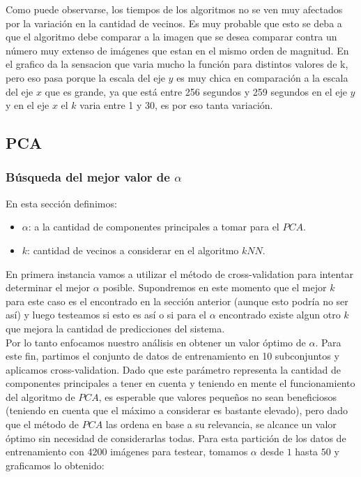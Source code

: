 Como puede observarse, los tiempos de los algoritmos no se ven muy afectados por la variación en la cantidad de vecinos. Es muy probable que esto se deba a que el algoritmo debe comparar a la imagen que se desea comparar contra un número muy extenso de imágenes que estan en el mismo orden de magnitud.
En el grafico da la sensacion que varia mucho la función para distintos valores de k, pero eso pasa porque la escala del eje $y$ es muy chica en comparación a la escala del eje $x$ que es grande, ya que está entre 256 segundos y 259 segundos en el eje $y$ y en el eje $x$  el $k$ varia entre 1 y 30, es por eso tanta variación.

\subsection{PCA}
\subsubsection{Búsqueda del mejor valor de $\alpha$}
En esta sección definimos:
\begin{itemize}
	\item $\alpha$: a la cantidad de componentes principales a tomar para el $PCA$.
	\item $k$: cantidad de vecinos a considerar en el algoritmo $kNN$.
\end{itemize}
En primera instancia vamos a utilizar el método de cross-validation para intentar determinar el mejor $\alpha$ posible. Supondremos en este momento que el mejor $k$ para este caso es el encontrado en la sección anterior (aunque esto podría no ser así) y luego testeamos si esto es así o si para el $\alpha$ encontrado existe algun otro $k$ que mejora la cantidad de predicciones del sistema.
\\
Por lo tanto enfocamos nuestro análisis en obtener un valor óptimo de $\alpha$. Para este fin, partimos el conjunto de datos de entrenamiento en 10 subconjuntos y aplicamos cross-validation. Dado que este parámetro representa la cantidad de componentes principales a tener en cuenta y teniendo en mente el funcionamiento del algoritmo de $PCA$, es esperable que valores pequeños no sean beneficiosos (teniendo en cuenta que el máximo a considerar es bastante elevado), pero dado que el método de $PCA$ las ordena en base a su relevancia, se alcance un valor óptimo sin necesidad de considerarlas todas. Para esta partición de los datos de entrenamiento con 4200 imágenes para testear, tomamos $\alpha$ desde $1$ hasta $50$ y graficamos lo obtenido:

